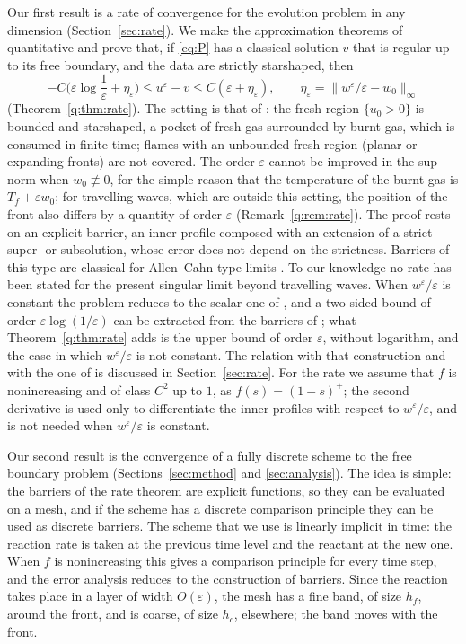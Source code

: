 \documentclass[11pt]{amsart}
\theoremstyle{definition}
\theoremstyle{remark}
\newcommand{\ve}{\varepsilon}
\begin{document}
Our first result is a rate of convergence for the evolution problem in any
dimension (Section~\ref{sec:rate}). We make the approximation theorems of
\cite{FernandezBonderWolanski2004} quantitative and prove that, if \eqref{eq:P} has a
classical solution $v$ that is regular up to its free boundary, and the data are
strictly starshaped, then
\[
-C\Big(\ve\log\frac1\ve+\eta_\ve\Big)\le u^\ve-v\le C(\ve+\eta_\ve),\qquad \eta_\ve=\|w^\ve/\ve-w_0\|_\infty
\]
(Theorem~\ref{q:thm:rate}). The setting is that of \cite{FernandezBonderWolanski2004}:
the fresh region $\{u_0>0\}$ is bounded and starshaped, a pocket of fresh gas surrounded
by burnt gas, which is consumed in finite time; flames with an unbounded fresh region
(planar or expanding fronts) are not covered. The order $\ve$ cannot be improved in the
sup norm when $w_0\not\equiv0$, for the simple reason that the temperature of the burnt
gas is $T_f+\ve w_0$; for travelling waves, which are outside this setting,
the position of the front also differs by a quantity of order $\ve$
(Remark~\ref{q:rem:rate}). The proof rests on
an explicit barrier, an inner profile composed with an extension of a strict
super- or subsolution, whose error does not depend on the strictness. Barriers of
this type are classical for Allen--Cahn type limits
\cite{Chen1992,AlfaroHilhorstMatano2008}. To our knowledge no rate has been stated for
the present singular limit beyond travelling waves. When $w^\ve/\ve$ is constant the
problem reduces to the scalar one of \cite{CaffarelliVazquez1995,Petrosyan2002}, and a
two-sided bound of order $\ve\log(1/\ve)$ can be extracted from the barriers of
\cite{Petrosyan2002}; what Theorem~\ref{q:thm:rate} adds is the upper bound of order
$\ve$, without logarithm, and the case in which $w^\ve/\ve$ is not constant. The
relation with that construction and with the one of \cite{FernandezBonderWolanski2004}
is discussed in Section~\ref{sec:rate}. For the rate we assume that $f$ is nonincreasing and of class
$C^2$ up to $1$, as $f(s)=(1-s)^+$; the second derivative is used only to differentiate
the inner profiles with respect to $w^\ve/\ve$, and is not needed when $w^\ve/\ve$ is
constant.

Our second result is the convergence of a fully discrete scheme to the free boundary
problem (Sections~\ref{sec:method} and \ref{sec:analysis}). The idea is simple: the
barriers of the rate theorem are explicit functions, so they can be evaluated on a
mesh, and if the scheme has a discrete comparison principle they can be used as discrete
barriers. The scheme that we use is linearly implicit in time: the reaction rate is
taken at the previous time level and the reactant at the new one. When $f$ is
nonincreasing this gives a comparison principle for every time step, and the error
analysis reduces to the construction of barriers. Since the reaction takes place in a
layer of width $O(\ve)$, the mesh has a fine band, of size $h_f$, around the front, and
is coarse, of size $h_c$, elsewhere; the band moves with the front.
\end{document}

